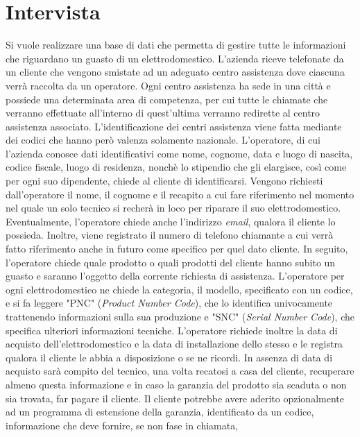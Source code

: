 \documentclass[a4paper, 12pt]{report}
\begin{document}
\section{Intervista}
Si vuole realizzare una base di dati che permetta di gestire tutte le informazioni che riguardano un guasto di un elettrodomestico.
L'azienda riceve telefonate da un cliente che vengono smistate ad un adeguato centro assistenza dove ciascuna verrà raccolta da un operatore.
Ogni centro assistenza ha sede in una città e possiede una determinata area di competenza, per cui tutte le chiamate che verranno effettuate
all'interno di quest'ultima verranno redirette al centro assistenza associato. L'identificazione dei centri assistenza viene fatta mediante dei
codici che hanno però valenza solamente nazionale.\newline
L'operatore, di cui l'azienda conosce dati identificativi come nome, cognome, data e luogo di nascita, codice fiscale, luogo di residenza, nonchè lo 
stipendio che gli elargisce, così come per ogni suo dipendente, chiede al cliente di identificarsi. Vengono richiesti dall'operatore 
il nome, il cognome e il recapito a cui fare riferimento nel momento nel quale un solo tecnico si recherà in loco per riparare il suo elettrodomestico. 
Eventualmente, l'operatore chiede anche l'indirizzo \textit{email}, qualora il cliente lo possieda. Inoltre, viene registrato il numero di telefono 
chiamante a cui verrà fatto riferimento anche in futuro come specifico per quel dato cliente.\newline
In seguito, l'operatore chiede quale prodotto o quali prodotti del cliente hanno subito un guasto e saranno l'oggetto della corrente richiesta di 
assistenza. L'operatore per ogni elettrodomestico ne chiede la categoria, il modello, specificato con un codice, e si fa leggere "PNC" (\textit{Product 
Number Code}), che lo identifica univocamente trattenendo informazioni sulla sua produzione e "SNC" (\textit{Serial Number Code}), che specifica ulteriori 
informazioni tecniche. L'operatore richiede inoltre la data di acquisto dell'elettrodomestico e la data di installazione dello stesso e le registra qualora 
il cliente le abbia a disposizione o se ne ricordi. In assenza di data di acquisto sarà compito del tecnico, una volta recatosi a casa del cliente, 
recuperare almeno questa informazione e in caso la garanzia del prodotto sia scaduta o non sia trovata, far pagare il cliente. Il cliente potrebbe avere 
aderito opzionalmente ad un programma di estensione della garanzia, identificato da un codice, informazione che deve fornire, se non fase in chiamata, 
\end{document}
